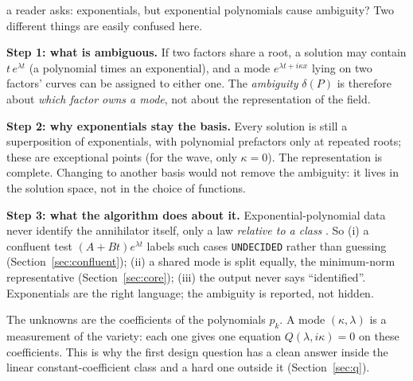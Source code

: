 \begin{explained}{a reader asks: exponentials, but exponential polynomials cause ambiguity?}
Two different things are easily confused here.

\medskip\textbf{Step 1: what is ambiguous.} If two factors share a root, a solution may contain $t\,e^{\lambda t}$ (a polynomial times an exponential), and a mode $e^{\lambda t+i\kappa x}$ lying on two factors' curves can be assigned to either one. The \emph{ambiguity} $\delta(P)$ is therefore about \emph{which factor owns a mode}, not about the representation of the field.

\medskip\textbf{Step 2: why exponentials stay the basis.} Every solution is still a superposition of exponentials, with polynomial prefactors only at repeated roots; these are exceptional points (for the wave, only $\kappa=0$). The representation is complete. Changing to another basis would not remove the ambiguity: it lives in the solution space, not in the choice of functions.

\medskip\textbf{Step 3: what the algorithm does about it.} Exponential-polynomial data never identify the annihilator itself, only a law \emph{relative to a class} . So (i) a confluent test $(A+Bt)e^{\lambda t}$ labels such cases \texttt{UNDECIDED} rather than guessing (Section~\ref{sec:confluent}); (ii) a shared mode is split equally, the minimum-norm representative (Section~\ref{sec:core}); (iii) the output never says ``identified''. Exponentials are the right language; the ambiguity is reported, not hidden.
\end{explained}

\begin{takeaway}
The unknowns are the coefficients of the polynomials $p_k$. A mode $(\kappa,\lambda)$ is a measurement of the variety: each one gives one equation $Q(\lambda,i\kappa)=0$ on these coefficients. This is why the first design question has a clean answer inside the linear constant-coefficient class and a hard one outside it (Section~\ref{sec:q}).
\end{takeaway}
